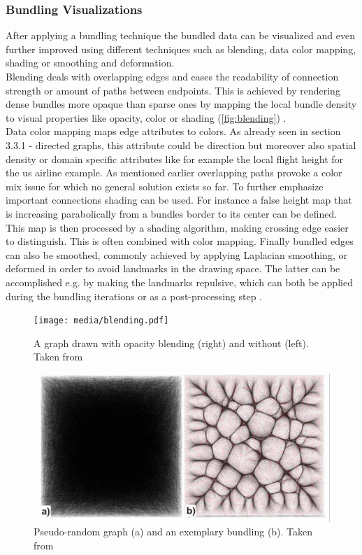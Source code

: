 \subsubsection{Bundling Visualizations}
After applying a bundling technique the bundled data can be visualized and even further improved using different techniques such as blending, data color mapping, shading or smoothing and deformation.\\
Blending deals with overlapping edges and eases the readability of connection strength or amount of paths between endpoints. This is achieved by rendering dense bundles more opaque than sparse ones by mapping the local bundle density to visual properties like opacity, color or shading (\autoref{fig:blending}) \cite{Lhuillier2017}.\\
Data color mapping maps edge attributes to colors. As already seen in section 3.3.1 - directed graphs, this attribute could be direction but moreover also spatial density or domain specific attributes like for example the local flight height for the us airline example. As mentioned earlier overlapping paths provoke a color mix issue for which no general solution exists so far.
To further emphasize important connections shading can be used. For instance a false height map that is increasing parabolically from a bundles border to its center can be defined. This map is then processed by a shading algorithm, making crossing edge easier to distinguish. This is often combined with color mapping.
Finally bundled edges can also be smoothed, commonly achieved by applying Laplacian smoothing, or deformed in order to avoid landmarks in the drawing space. The latter can be accomplished e.g. by making the landmarks repulsive, which can both be applied during the bundling iterations or as a post-processing step \cite{Lhuillier2017}.

\begin{figure}
    \centering
    \texttt{[image: media/blending.pdf]}
    \caption{A graph drawn with opacity blending (right) and without (left). Taken from \cite{Lhuillier2017}}
    \label{fig:blending}
\end{figure}
\begin{figure}
    \centering
    \includegraphics[scale=0.8]{media/faithfullness_bundling.pdf}
    \caption{Pseudo-random graph (a) and an exemplary bundling (b). Taken from \cite{Lhuillier2017}}
    \label{fig:faithfulness}
\end{figure}
